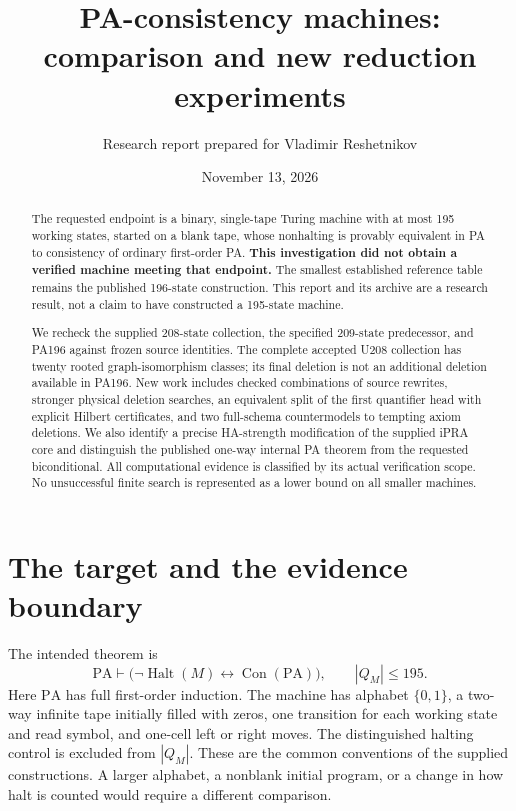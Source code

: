 \documentclass[11pt,letterpaper]{article}
\title{PA-consistency machines:\\comparison and new reduction experiments}
\author{Research report prepared for Vladimir Reshetnikov}
\date{November 13, 2026}
\newcommand{\PA}{\mathrm{PA}}
\newcommand{\Con}{\operatorname{Con}}
\newcommand{\Halt}{\operatorname{Halt}}
\begin{document}
\maketitle
\begin{abstract}
The requested endpoint is a binary, single-tape Turing machine with at
most 195 working states, started on a blank tape, whose nonhalting is
provably equivalent in PA to consistency of ordinary first-order PA.
\textbf{This investigation did not obtain a verified machine meeting
that endpoint.} The smallest established reference table remains the
published 196-state construction. This report and its archive are a
research result, not a claim to have constructed a 195-state machine.

We recheck the supplied 208-state collection, the specified 209-state
predecessor, and PA196 against frozen source identities. The complete
accepted U208 collection has twenty rooted graph-isomorphism classes;
its final deletion is not an additional deletion available in PA196.
New work includes checked combinations of source rewrites, stronger
physical deletion searches, an equivalent split of the first quantifier
head with explicit Hilbert certificates, and two full-schema
countermodels to tempting axiom deletions. We also identify a precise
HA-strength modification of the supplied iPRA core and distinguish the
published one-way internal PA theorem from the requested biconditional.
All computational evidence is classified by its actual verification
scope. No unsuccessful finite search is represented as a lower bound on
all smaller machines.
\end{abstract}
\setcounter{tocdepth}{1}
\tableofcontents
\clearpage

\section{The target and the evidence boundary}

The intended theorem is
\[
 \PA\vdash\bigl(\neg\Halt(M)\leftrightarrow\Con(\PA)\bigr),
 \qquad |Q_M|\le195.
\]
Here $\PA$ has full first-order induction. The machine has alphabet
$\{0,1\}$, a two-way infinite tape initially filled with zeros, one
transition for each working state and read symbol, and one-cell left or
right moves. The distinguished halting control is excluded from $|Q_M|$.
These are the common conventions of the supplied constructions. A larger
alphabet, a nonblank initial program, or a change in how halt is counted
would require a different comparison.
\end{document}
